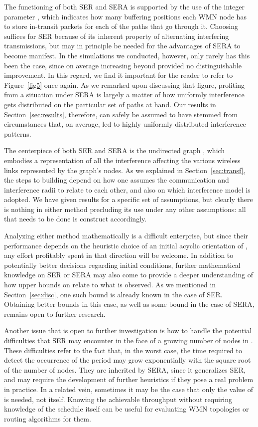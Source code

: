 \documentclass{article}
\begin{document}
The functioning of both SER and SERA is supported by the use of the integer
parameter , which indicates how many buffering positions each WMN node
has to store in-transit packets for each of the paths that go through it.
Choosing  suffices for SER because of its inherent property of alternating
interfering transmissions, but  may in principle be needed for the
advantages of SERA to become manifest. In the simulations we conducted, however,
only rarely has this been the case, since on average increasing  beyond 
provided no distinguishable improvement. In this regard, we find it important
for the reader to refer to Figure~\ref{fig5} once again. As we remarked upon
discussing that figure, profiting from a  situation under SERA is largely
a matter of how uniformly interference gets distributed on the particular set of
paths at hand. Our results in Section~\ref{sec:results}, therefore, can safely
be assumed to have stemmed from circumstances that, on average, led to highly
uniformly distributed interference patterns.

The centerpiece of both SER and SERA is the undirected graph , which embodies
a representation of all the interference affecting the various wireless links
represented by the graph's nodes. As we explained in Section~\ref{sec:transf},
the steps to building  depend on how one assumes the communication and
interference radii to relate to each other, and also on which interference model
is adopted. We have given results for a specific set of assumptions, but clearly
there is nothing in either method precluding its use under any other
assumptions: all that needs to be done is construct  accordingly.

Analyzing either method mathematically is a difficult enterprise, but since
their performance depends on the heuristic choice of an initial acyclic
orientation of , any effort profitably spent in that direction will be
welcome. In addition to potentially better decisions regarding initial
conditions, further mathematical knowledge on SER or SERA may also come to
provide a deeper understanding of how upper bounds on  relate to
what is observed. As we mentioned in Section~\ref{sec:disc}, one such bound is
already known in the case of SER. Obtaining better bounds in this case, as well
as some bound in the case of SERA, remains open to further research.

Another issue that is open to further investigation is how to handle the
potential difficulties that SER may encounter in the face of a growing number of
nodes in  \cite{mr92,mmz93}. These difficulties refer to the fact that, in
the worst case, the time required to detect the occurrence of the period may
grow exponentially with the square root of the number of nodes. They are
inherited by SERA, since it generalizes SER, and may require the development of
further heuristics if they pose a real problem in practice. In a related vein,
sometimes it may be the case that only the value of  is needed,
not  itself. Knowing the achievable throughput without requiring
knowledge of the schedule itself can be useful for evaluating WMN topologies or
routing algorithms for them.
\end{document}

